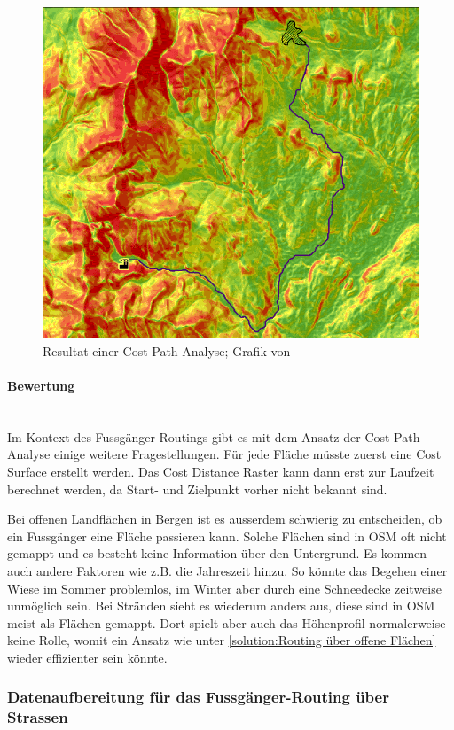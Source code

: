 \begin{figure}[ht]
    \centering
    \includegraphics[width=0.6\linewidth]{technicalreport/img/cost_path_analysis}
    \caption[Cost Path Analyse]{Resultat einer Cost Path Analyse; Grafik von \cite{geospatial_analysis}}
    \label{fig:cost_path_analysis}
\end{figure}

\paragraph{Bewertung}~\\
Im Kontext des Fussgänger-Routings gibt es mit dem Ansatz der Cost Path Analyse einige weitere Fragestellungen. Für jede Fläche müsste zuerst eine Cost Surface erstellt werden. Das Cost Distance Raster kann dann erst zur Laufzeit berechnet werden, da Start- und Zielpunkt vorher nicht bekannt sind.

Bei offenen Landflächen in Bergen ist es ausserdem schwierig zu entscheiden, ob ein Fussgänger eine Fläche passieren kann. Solche Flächen sind in \ac{OSM} oft nicht gemappt und es besteht keine Information über den Untergrund. Es kommen auch andere Faktoren wie z.B. die Jahreszeit hinzu. So könnte das Begehen einer Wiese im Sommer problemlos, im Winter aber durch eine Schneedecke zeitweise unmöglich sein. Bei Stränden sieht es wiederum anders aus, diese sind in \ac{OSM} meist als Flächen gemappt. Dort spielt aber auch das Höhenprofil normalerweise keine Rolle, womit ein Ansatz wie unter \ref{solution:Routing über offene Flächen} wieder effizienter sein könnte.


\subsubsection{Datenaufbereitung für das Fussgänger-Routing über Strassen}
\label{subsub:Datenaufbereitung für das Fussgänger-Routing über Strassen}

